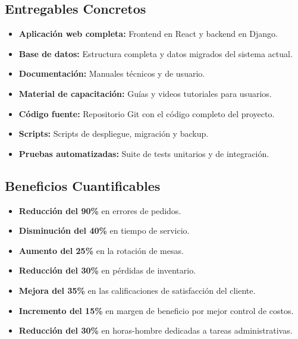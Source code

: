 \documentclass[12pt]{article}
\begin{document}
\subsection{Entregables Concretos}
\begin{itemize}
  \item \textbf{Aplicación web completa:} Frontend en React y backend en Django.
  \item \textbf{Base de datos:} Estructura completa y datos migrados del sistema actual.
  \item \textbf{Documentación:} Manuales técnicos y de usuario.
  \item \textbf{Material de capacitación:} Guías y videos tutoriales para usuarios.
  \item \textbf{Código fuente:} Repositorio Git con el código completo del proyecto.
  \item \textbf{Scripts:} Scripts de despliegue, migración y backup.
  \item \textbf{Pruebas automatizadas:} Suite de tests unitarios y de integración.
\end{itemize}

\subsection{Beneficios Cuantificables}
\begin{itemize}
  \item \textbf{Reducción del 90\%} en errores de pedidos.
  \item \textbf{Disminución del 40\%} en tiempo de servicio.
  \item \textbf{Aumento del 25\%} en la rotación de mesas.
  \item \textbf{Reducción del 30\%} en pérdidas de inventario.
  \item \textbf{Mejora del 35\%} en las calificaciones de satisfacción del cliente.
  \item \textbf{Incremento del 15\%} en margen de beneficio por mejor control de costos.
  \item \textbf{Reducción del 30\%} en horas-hombre dedicadas a tareas administrativas.
\end{itemize}
\end{document}
